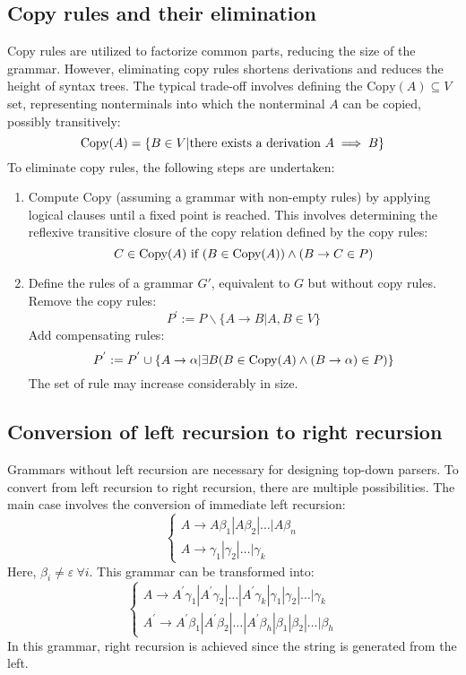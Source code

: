 \subsection{Copy rules and their elimination}
Copy rules are utilized to factorize common parts, reducing the size of the grammar.
However, eliminating copy rules shortens derivations and reduces the height of syntax trees.
The typical trade-off involves defining the $\text{Copy}(A)\subseteq V$ set, representing nonterminals into which the nonterminal $A$ can be copied, possibly transitively:
\[\textnormal{Copy}(A)=\{B \in V | \textnormal{there exists a derivation } A \implies B\}\]
To eliminate copy rules, the following steps are undertaken:
\begin{enumerate}
    \item Compute $\text{Copy}$ (assuming a grammar with non-empty rules) by applying logical clauses until a fixed point is reached. 
        This involves determining the reflexive transitive closure of the copy relation defined by the copy rules:
        \[C \in \textnormal{Copy}(A) \textnormal{ if } (B \in \textnormal{Copy}(A)) \land (B \rightarrow C \in P)\]
    \item  Define the rules of a grammar $G'$, equivalent to $G$ but without copy rules. 
        Remove the copy rules:
        \[P^{'}:=P \backslash \{A \rightarrow B|A,B \in V\}\]
        Add compensating rules:
        \[P^{'}:=P^{'}\cup\{A \rightarrow \alpha|\exists B (B \in \textnormal{Copy}(A) \land (B \rightarrow \alpha) \in P)\}\]
        The set of rule may increase considerably in size. 
\end{enumerate}

\subsection{Conversion of left recursion to right recursion}
Grammars without left recursion are necessary for designing top-down parsers. 
To convert from left recursion to right recursion, there are multiple possibilities. 
The main case involves the conversion of immediate left recursion:
\[\begin{cases}
    A \rightarrow A\beta_1|A\beta_2|\dots|A\beta_n \\
    A \rightarrow \gamma_1|\gamma_2|\dots|\gamma_k
\end{cases}\]
Here, $\beta_i \neq \varepsilon \: \forall i$. 
This grammar can be transformed into:
\[\begin{cases}
    A \rightarrow A^{'}\gamma_1|A^{'}\gamma_2|\dots|A^{'}\gamma_k|\gamma_1|\gamma_2|\dots|\gamma_k  \\
    A^{'} \rightarrow A^{'}\beta_1|A^{'}\beta_2|\dots|A^{'}\beta_h|\beta_1|\beta_2|\dots|\beta_h
\end{cases}\]
In this grammar, right recursion is achieved since the string is generated from the left.

